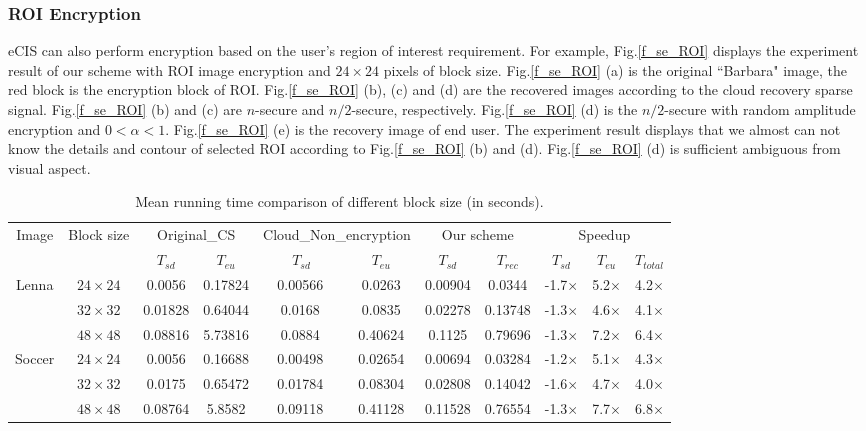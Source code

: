 \documentclass[conference]{IEEEtran}
\begin{document}
\subsubsection{ROI Encryption}
eCIS can also  perform  encryption based on the user's  region of interest requirement. For example, Fig.\ref{f_se_ROI} displays the experiment result of our scheme with ROI image encryption and $24\times 24$ pixels of  block size. Fig.\ref{f_se_ROI} (a) is the original ``Barbara" image, the red block is the encryption block of ROI. Fig.\ref{f_se_ROI} (b), (c) and (d) are the recovered  images according to the cloud recovery sparse signal. Fig.\ref{f_se_ROI} (b) and (c) are $n$-secure and $n/2$-secure, respectively. Fig.\ref{f_se_ROI} (d) is the $n/2$-secure with random amplitude encryption and $0<\alpha<1$. Fig.\ref{f_se_ROI} (e) is the recovery image of end user. The experiment result displays that we almost can not know the details and contour of selected ROI according to Fig.\ref{f_se_ROI} (b) and (d). Fig.\ref{f_se_ROI} (d) is sufficient  ambiguous from visual aspect.
\begin{table*}
\begin{center}
\caption{Mean running time comparison of different block size (in seconds).}\label{t_run_time_comp}
\begin{tabular}[t]{|c|c|c|c|c|c|c|c|c|c|c|}
\hline
\multirow{2}{*}{Image} & \multirow{2}{*}{Block size} & \multicolumn{2}{c|}{Original\_CS} & \multicolumn{2}{c|}{Cloud\_Non\_encryption} & \multicolumn{2}{c|}{Our scheme} & \multicolumn{3}{c|}{Speedup}\tabularnewline
\cline{3-11}
 &  & $T_{sd}$ & $T_{eu}$ & ~~~$T_{sd}$ ~~ & $T_{eu}$ & $T_{sd}$ & $T_{rec}$ & $T_{sd}$ & $T_{eu}$ & $T_{total}$  \tabularnewline
\hline
\multirow{3}{*}{Lenna} & $24\times24$ & 0.0056  & 0.17824  & 0.00566  & 0.0263  & 0.00904  & 0.0344  & -1.7$\times$ & 5.2$\times$ & 4.2$\times$\tabularnewline
\cline{2-11}
 & $32\times32$ & 0.01828  & 0.64044  & 0.0168  & 0.0835  & 0.02278  & 0.13748  & -1.3$\times$ & 4.6$\times$ & 4.1$\times$\tabularnewline
\cline{2-11}
 & $48\times48$ & 0.08816  & 5.73816  & 0.0884  & 0.40624  & 0.1125  & 0.79696  & -1.3$\times$ & 7.2$\times$ & 6.4$\times$\tabularnewline
\hline
\multirow{3}{*}{Soccer} & $24\times24$ & 0.0056 & 0.16688 & 0.00498  & 0.02654  & 0.00694  & 0.03284  & -1.2$\times$ & 5.1$\times$ & 4.3$\times$\tabularnewline
\cline{2-11}
 & $32\times32$ & 0.0175  & 0.65472  & 0.01784  & 0.08304  & 0.02808  & 0.14042  & -1.6$\times$ & 4.7$\times$ & 4.0$\times$\tabularnewline
\cline{2-11}
 & $48\times48$ & 0.08764  & 5.8582  & 0.09118  & 0.41128  & 0.11528  & 0.76554  & -1.3$\times$ & 7.7$\times$ & 6.8$\times$\tabularnewline
\hline
\end{tabular}
\end{center}
\end{table*}
\end{document}
